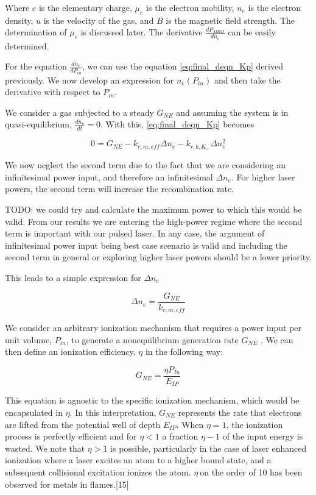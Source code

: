 Where $e$ is the elementary charge, $\mu_e$ is the electron mobility, $n_e$ is the electron density, $u$ is the velocity of the gas, and $B$ is the magnetic field strength.  The determination of $\mu_e$ is discussed later. The derivative $\frac{dP_{MHD}}{dn_{e}}$ can be easily determined. 

For the equation $\frac{dn_{e}}{dP_{in}}$, we can use the equation \ref{eq:final_deqn_Kp} derived previously. We now develop an expression for $n_{e}(P_{in})$ and then take the derivative with respect to $P_{in}$.

We consider a gas subjected to a steady $G_{NE}$ and assuming the system is in quasi-equilibrium, $\frac{dn_{e}}{dt} = 0$.  With this, \ref{eq:final_deqn_Kp} becomes

\begin{equation}
0 = G_{NE} - k_{r, m, eff}\Delta n_{e} - k_{r, b, K_{+}}\Delta n_{e}^2
\end{equation}

We now neglect the second term due to the fact that we are considering an infinitesimal power input, and therefore an infinitesimal $\Delta n_{e}$. For higher laser powers, the second term will increase the recombination rate. 

TODO: we could try and calculate the maximum power to which this would be valid. From our results we are entering the high-power regime where the second term is important with our pulsed laser. In any case, the argument of infinitesimal power input being best case scenario is valid and including the second term in general or exploring higher laser powers should be a lower priority.

This leads to a simple expression for $\Delta n_{e}$

\begin{equation}
\Delta n_{e} = \frac{G_{NE}}{k_{r, m, eff}}
\end{equation}


We consider an arbitrary ionization mechanism that requires a power input per unit volume, \(P_{in}\), to generate a nonequilibrium generation rate \(G_{NE}\) . We can then define an ionization efficiency, \(\eta\) in the following way:

\begin{equation}
{G}_{NE} = \frac{\eta P_{In}}{E_{IP}}
\end{equation}


This equation is agnostic to the specific ionization mechanism, which would be encapsulated in \(\eta\). In this interpretation, \(G_{NE}\) represents the rate that electrons are lifted from the potential well of depth \(E_{IP}\). When \(\eta = 1\), the ionization process is perfectly efficient and for \(\eta < 1\) a fraction \(\eta - 1\) of the input energy is wasted. We note that \(\eta > 1\) is possible, particularly in the case of laser enhanced ionization where a laser excites an atom to a higher bound state, and a subsequent collisional excitation ionizes the atom. \(\eta\ \)on the order of 10 has been observed for metals in flames.{[}15{]} 

